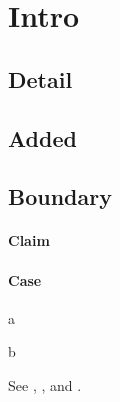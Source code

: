 \section{Intro}
\subsection{Detail}\label{sub:detail}
\subsection{Added}\label{sub:added}
\subsection{Boundary}\label{sub:boundary}
\paragraph{Claim}\label{par:claim}
\paragraph{Case}\label{par:case}
\begin{theorem}\label{thm:first}
a
\end{theorem}
\begin{lemma}\label{lem:first}
b
\end{lemma}
See , , and .
